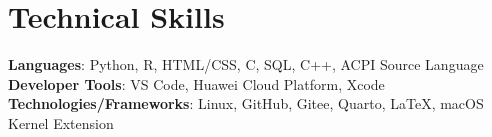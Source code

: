 \documentclass[letterpaper,11pt]{article}
\makeatletter
\newcommand{\resumeItem}[1]{
  \item\small{
    {#1 \vspace{-2pt}}
  }
}
\newcommand{\resumeSubheading}[4]{
  \vspace{-2pt}\item
    \begin{tabular*}{1.0\textwidth}[t]{l@{\extracolsep{\fill}}r}
      \textbf{#1} & \textbf{\small #2} \\
      \textit{\small#3} & \textit{\small #4} \\
    \end{tabular*}\vspace{-7pt}
}
\newcommand{\resumeSubHeadingListStart}{\begin{itemize}[leftmargin=0.0in, label={}]}
\newcommand{\resumeSubHeadingListEnd}{\end{itemize}}
\newcommand{\resumeItemListStart}{\begin{itemize}}
\newcommand{\resumeItemListEnd}{\end{itemize}\vspace{-5pt}}
\makeatother
\begin{document}
%
\section{Technical Skills}
 \begin{itemize}[leftmargin=0.15in, label={}]
    \small{\item{
     \textbf{Languages}{: Python, R, HTML/CSS, C, SQL, C++, ACPI Source Language} \\
     \textbf{Developer Tools}{: VS Code, Huawei Cloud Platform, Xcode} \\
     \textbf{Technologies/Frameworks}{: Linux, GitHub, Gitee, Quarto, \LaTeX, macOS Kernel Extension} \\
    }}
 \end{itemize}
 \vspace{-16pt}


        
\end{document}
